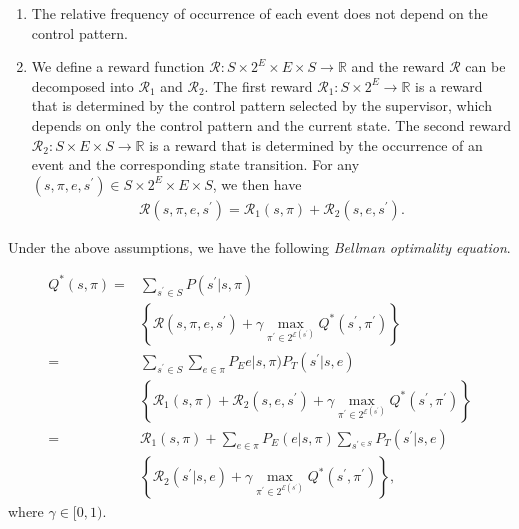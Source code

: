 \documentclass[letterpaper, 10 pt, conference, dvipdfmx]{ieeeconf}
\begin{document}
\begin{enumerate}
  \item The relative frequency of occurrence of each event does not depend on the control pattern.
  \item We define a reward function $\mathcal{R} : S \times 2^E \times E \times S \rightarrow \mathbb{R}$ and the reward $\mathcal{R}$ can be decomposed into $\mathcal{R}_1$ and $\mathcal{R}_2$. The first reward $\mathcal{R}_1 : S \times 2^E \rightarrow \mathbb{R}$ is a reward that is determined by the control pattern selected by the supervisor, which depends on only the control pattern and the current state. The second reward $\mathcal{R}_2 : S \times E \times S \rightarrow \mathbb{R}$ is a reward that is determined by the occurrence of an event and the corresponding state transition. For any $(s,\pi,e,s^{\prime}) \in S \times 2^E \times E \times S$, we then have
  \begin{align}
    \mathcal{R}(s,\pi,e,s^{\prime}) = \mathcal{R}_1(s,\pi) + \mathcal{R}_2(s,e,s^{\prime}).
  \end{align}
\end{enumerate}
Under the above assumptions, we have the following {\it Bellman optimality equation}.

\begin{align}
  Q^{\ast}(s,\pi) = & \sum_{s^{\prime} \in S} P(s^{\prime}|s,\pi)\nonumber \\
  & \left \{ \mathcal{R}(s,\pi,e,s^{\prime}) + \gamma \max_{\pi^{\prime} \in 2^{\mathcal{E}(s^{\prime})}} Q^{\ast}(s^{\prime},\pi^{\prime}) \right \} \nonumber \\
  = & \sum_{s^{\prime} \in S} \sum_{e \in \pi} P_Ee|s,\pi) P_T(s^{\prime}|s,e) \nonumber \\
  & \left \{ \mathcal{R}_1(s,\pi) + \mathcal{R}_2(s,e,s^{\prime}) + \gamma \max_{\pi^{\prime} \in 2^{\mathcal{E}(s^{\prime})}} Q^{\ast}(s^{\prime},\pi^{\prime}) \right \} \nonumber \\
  = & \mathcal{R}_1(s,\pi) + \sum_{e \in \pi} P_E(e|s,\pi) \sum_{s^{\prime \in S}} P_T(s^{\prime}|s,e) \nonumber \\
  & \left \{ \mathcal{R}_2(s^{\prime}|s,e) + \gamma \max_{\pi^{\prime} \in 2^{\mathcal{E}(s^{\prime})}} Q^{\ast}(s^{\prime}, \pi^{\prime}) \right \},
\end{align}
where $\gamma \in [0,1)$.
\end{document}
